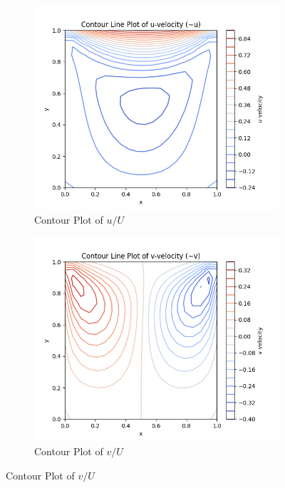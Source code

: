 \documentclass[11pt]{article}
\begin{document}
\begin{figure}[H]
   \centering
   \begin{subfigure}{0.495\linewidth}
      \includegraphics[width=\textwidth]{images/u_velocity.png}
      \caption{Contour Plot of $u/U$}
   \end{subfigure}
   \begin{subfigure}{0.495\linewidth}
      \includegraphics[width=\textwidth]{images/v_velocity.png}
      \caption{Contour Plot of $v/U$}
   \end{subfigure}      
   \label{contourplots}
\end{figure}
\end{document}

